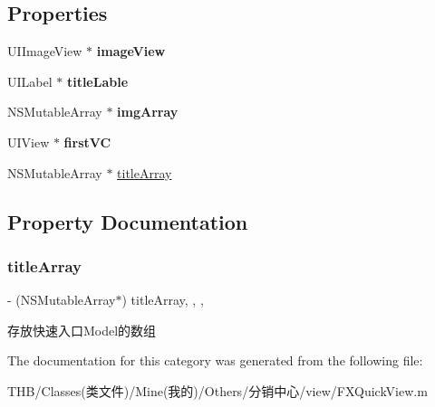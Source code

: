\subsection*{Properties}
\begin{DoxyCompactItemize}
\item 
\mbox{\label{category_f_x_quick_view_07_08_ab84b3b1a835264e290bc62bb0e7a1eef}} 
U\+I\+Image\+View $\ast$ {\bfseries image\+View}
\item 
\mbox{\label{category_f_x_quick_view_07_08_ae943696d06bb81d0d5284079dfa751ac}} 
U\+I\+Label $\ast$ {\bfseries title\+Lable}
\item 
\mbox{\label{category_f_x_quick_view_07_08_ae88430b496dfc299d4c7a634e951104e}} 
N\+S\+Mutable\+Array $\ast$ {\bfseries img\+Array}
\item 
\mbox{\label{category_f_x_quick_view_07_08_ac0603ff6ac98c33ed8e308f9e3f0219a}} 
U\+I\+View $\ast$ {\bfseries first\+VC}
\item 
N\+S\+Mutable\+Array $\ast$ \mbox{\hyperlink{category_f_x_quick_view_07_08_acb54e47f208bf3478963f8d8e0d809ba}{title\+Array}}
\end{DoxyCompactItemize}


\subsection{Property Documentation}
\mbox{\label{category_f_x_quick_view_07_08_acb54e47f208bf3478963f8d8e0d809ba}} 
\subsubsection{\texorpdfstring{title\+Array}{titleArray}}
{\footnotesize\ttfamily -\/ (N\+S\+Mutable\+Array$\ast$) title\+Array\hspace{0.3cm}{\ttfamily [read]}, {\ttfamily [write]}, {\ttfamily [nonatomic]}, {\ttfamily [strong]}}

存放快速入口\+Model的数组 

The documentation for this category was generated from the following file\+:\begin{DoxyCompactItemize}
\item 
T\+H\+B/\+Classes(类文件)/\+Mine(我的)/\+Others/分销中心/view/F\+X\+Quick\+View.\+m\end{DoxyCompactItemize}
